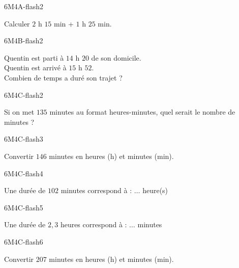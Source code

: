 \documentclass[a4paper,11pt,fleqn]{article}
\begin{document}
\begin{EXO}{}{6M4A-flash2}

 Calculer $2\text{ h } 15$ min + $1\text{ h } 25$ min.
\end{EXO}

\begin{EXO}{}{6M4B-flash2}

 Quentin est parti à  $14\text{~h~}20$ de son domicile.\\
    Quentin est arrivé à $15\text{~h~}52$.\\
    Combien de temps a duré son trajet ?
\end{EXO}

\begin{EXO}{}{6M4C-flash2}

  Si on met $135$ minutes au format heures-minutes, quel serait le nombre de minutes ?
\end{EXO}

\begin{EXO}{}{6M4C-flash3}

 Convertir $146$ minutes en heures ($\text{h}$) et minutes ($\text{min}$).
\end{EXO}

\begin{EXO}{}{6M4C-flash4}

 Une durée de $102$ minutes correspond à : $\ldots$ heure(s)
\end{EXO}

\begin{EXO}{}{6M4C-flash5}

 Une durée de $2{,}3$ heures correspond à : $\ldots$ minutes
\end{EXO}

\begin{EXO}{}{6M4C-flash6}

 Convertir $207$ minutes en heures ($\text{h}$) et minutes ($\text{min}$).
\end{EXO}
\end{document}
